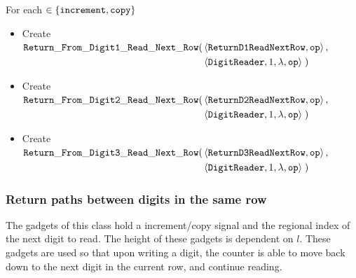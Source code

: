         \noindent For each {\inc} $\in \{ {\tt increment, copy } \}$

        \begin{itemize}
            \item Create
            $\begin{aligned}[t]
                {\tt Return\_From\_Digit1\_Read\_Next\_Row}(& \left \langle {\tt ReturnD1ReadNextRow},     {\tt op} \right\rangle, & \\
                                           & \left \langle {\tt DigitReader}, 1, \lambda, {\tt op} \right\rangle \;)
            \end{aligned}$

            \item Create
            $\begin{aligned}[t]
                {\tt Return\_From\_Digit2\_Read\_Next\_Row}(& \left \langle {\tt ReturnD2ReadNextRow},     {\tt op} \right\rangle, & \\
                                           & \left \langle {\tt DigitReader}, 1, \lambda, {\tt op} \right\rangle \;)
            \end{aligned}$

            \item Create
            $\begin{aligned}[t]
                {\tt Return\_From\_Digit3\_Read\_Next\_Row}(& \left \langle {\tt ReturnD3ReadNextRow},     {\tt op} \right\rangle, & \\
                                             & \left \langle {\tt DigitReader}, 1, \lambda, {\tt op} \right\rangle \;)
            \end{aligned}$
        \end{itemize}
    \vspace{1cm}



    \subsubsection{Return paths between digits in the same row}
        The gadgets of this class hold a increment/copy signal and the regional index
        of the next digit to read. The height of these gadgets is dependent on $l$.
        These gadgets are used so that upon writing a digit, the counter
        is able to move back down to the next digit in the current row, and continue
        reading.
        \vspace{1cm}

